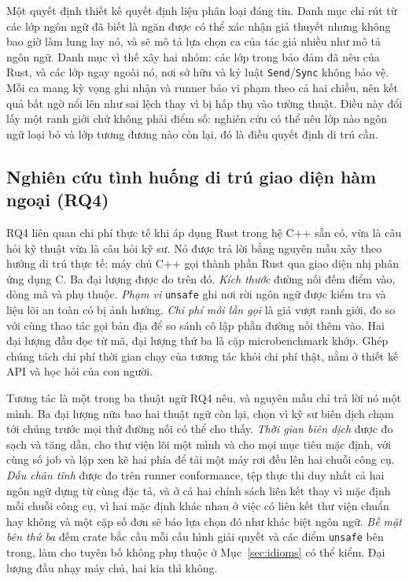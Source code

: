 Một quyết định thiết kế quyết định liệu phân loại đáng tin. Danh mục chỉ rút từ các lớp ngôn ngữ
đã biết là ngăn được có thể xác nhận giả thuyết nhưng không bao giờ làm lung lay nó, và sẽ mô tả
lựa chọn ca của tác giả nhiều như mô tả ngôn ngữ. Danh mục vì thế xây hai nhóm: các lớp trong
bảo đảm đã nêu của Rust, và các lớp ngay ngoài nó, nơi sở hữu và kỷ luật \texttt{Send}/\texttt{Sync}
không bảo vệ. Mỗi ca mang kỳ vọng ghi nhận và runner báo vi phạm theo cả hai chiều, nên kết quả
bất ngờ nổi lên như sai lệch thay vì bị hấp thụ vào tường thuật. Điều này đổi lấy một ranh giới
chứ không phải điểm số: nghiên cứu có thể nêu lớp nào ngôn ngữ loại bỏ và lớp tương đương nào còn
lại, đó là điều quyết định di trú cần.

\subsection{Nghiên cứu tình huống di trú giao diện hàm ngoại (RQ4)}\label{sec:methodffi}
RQ4 liên quan chi phí thực tế khi áp dụng Rust trong hệ C++ sẵn có, vừa là câu hỏi kỹ thuật vừa
là câu hỏi kỹ sư. Nó được trả lời bằng nguyên mẫu xây theo hướng di trú thực tế: máy chủ C++ gọi
thành phần Rust qua giao diện nhị phân ứng dụng C. Ba đại lượng được đo trên đó. \emph{Kích
thước} đường nối đếm điểm vào, dòng mã và phụ thuộc. \emph{Phạm vi} \texttt{unsafe} ghi nơi rời
ngôn ngữ được kiểm tra và liệu lõi an toàn có bị ảnh hưởng. \emph{Chi phí mỗi lần gọi} là giá
vượt ranh giới, đo so với cùng thao tác gọi bản địa để so sánh cô lập phần đường nối thêm vào.
Hai đại lượng đầu đọc từ mã, đại lượng thứ ba là cặp microbenchmark khớp. Ghép chúng tách chi phí
thời gian chạy của tương tác khỏi chi phí thật, nằm ở thiết kế API và học hỏi của con người.

Tương tác là một trong ba thuật ngữ RQ4 nêu, và nguyên mẫu chỉ trả lời nó một mình. Ba đại lượng
nữa bao hai thuật ngữ còn lại, chọn vì kỹ sư biên dịch chạm tới chúng trước mọi thứ đường nối có
thể cho thấy. \emph{Thời gian biên dịch} được đo sạch và tăng dần, cho thư viện lõi một mình và
cho mọi mục tiêu mặc định, với cùng số job và lặp xen kẽ hai phía để tải một máy rơi đều lên hai
chuỗi công cụ. \emph{Dấu chân tĩnh} được đo trên runner conformance, tệp thực thi duy nhất cả
hai ngôn ngữ dựng từ cùng đặc tả, và ở cả hai chính sách liên kết thay vì mặc định mỗi chuỗi công
cụ, vì hai mặc định khác nhau ở việc có liên kết thư viện chuẩn hay không và một cặp số đơn sẽ báo
lựa chọn đó như khác biệt ngôn ngữ. \emph{Bề mặt bên thứ ba} đếm crate bắc cầu mỗi cấu hình giải
quyết và các điểm \texttt{unsafe} bên trong, làm cho tuyên bố không phụ thuộc ở Mục~\ref{sec:idioms}
có thể kiểm. Đại lượng đầu nhạy máy chủ, hai kia thì không.

